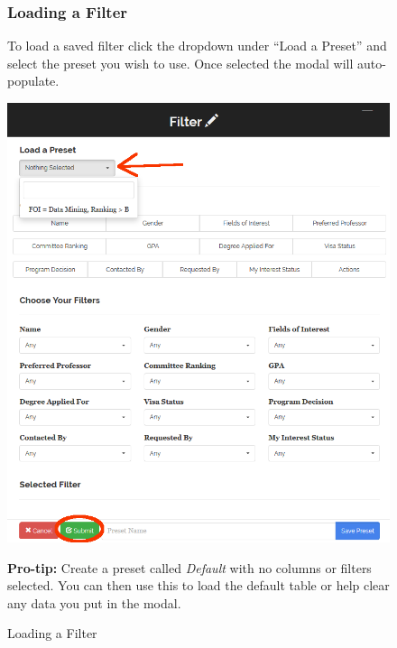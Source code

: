\documentclass[fontsize=12pt,paper=letter,twoside]{scrartcl}
\begin{document}
\begin{figure}[!htb]
\subsubsection{Loading a Filter}
To load a saved filter click the dropdown under ``Load a Preset'' and select the preset you wish to use. Once selected the modal will auto-populate.
\begin{center}
\includegraphics[width=.99\textwidth]{images/load_filter.png}
\end{center}
\caption{Loading a Filter}
\textbf{Pro-tip:} Create a preset called \emph{Default} with no columns or filters selected. You can then use this to load the default table or help clear any data you put in the modal.
\label{fig:save_filter}
\end{figure}

\clearpage
\end{document}
